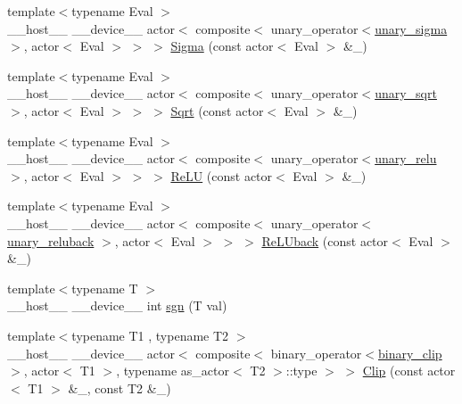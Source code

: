 \begin{DoxyCompactItemize}
\item 
{\footnotesize template$<$typename Eval $>$ }\\\+\_\+\+\_\+host\+\_\+\+\_\+ \+\_\+\+\_\+device\+\_\+\+\_\+ actor$<$ composite$<$ unary\+\_\+operator$<$\hyperlink{structthrust_1_1detail_1_1functional_1_1unary__sigma}{unary\+\_\+sigma} $>$, actor$<$ Eval $>$ $>$ $>$ \hyperlink{namespacethrust_1_1detail_1_1functional_aa947e17014d1d891812df6265b94a8bb}{Sigma} (const actor$<$ Eval $>$ \&\+\_)
\item 
{\footnotesize template$<$typename Eval $>$ }\\\+\_\+\+\_\+host\+\_\+\+\_\+ \+\_\+\+\_\+device\+\_\+\+\_\+ actor$<$ composite$<$ unary\+\_\+operator$<$\hyperlink{structthrust_1_1detail_1_1functional_1_1unary__sqrt}{unary\+\_\+sqrt} $>$, actor$<$ Eval $>$ $>$ $>$ \hyperlink{namespacethrust_1_1detail_1_1functional_a4312d4fbc25873ae875a6986a86cef23}{Sqrt} (const actor$<$ Eval $>$ \&\+\_)
\item 
{\footnotesize template$<$typename Eval $>$ }\\\+\_\+\+\_\+host\+\_\+\+\_\+ \+\_\+\+\_\+device\+\_\+\+\_\+ actor$<$ composite$<$ unary\+\_\+operator$<$\hyperlink{structthrust_1_1detail_1_1functional_1_1unary__relu}{unary\+\_\+relu} $>$, actor$<$ Eval $>$ $>$ $>$ \hyperlink{namespacethrust_1_1detail_1_1functional_a98a54b55473395eabc5424da89281e02}{Re\+LU} (const actor$<$ Eval $>$ \&\+\_)
\item 
{\footnotesize template$<$typename Eval $>$ }\\\+\_\+\+\_\+host\+\_\+\+\_\+ \+\_\+\+\_\+device\+\_\+\+\_\+ actor$<$ composite$<$ unary\+\_\+operator$<$\hyperlink{structthrust_1_1detail_1_1functional_1_1unary__reluback}{unary\+\_\+reluback} $>$, actor$<$ Eval $>$ $>$ $>$ \hyperlink{namespacethrust_1_1detail_1_1functional_a2c1a5d581fb286f11d8ae4d9351074f1}{Re\+L\+Uback} (const actor$<$ Eval $>$ \&\+\_)
\item 
{\footnotesize template$<$typename T $>$ }\\\+\_\+\+\_\+host\+\_\+\+\_\+ \+\_\+\+\_\+device\+\_\+\+\_\+ int \hyperlink{namespacethrust_1_1detail_1_1functional_a340839a77ee36e3897fe8a8a53365ed0}{sgn} (T val)
\item 
{\footnotesize template$<$typename T1 , typename T2 $>$ }\\\+\_\+\+\_\+host\+\_\+\+\_\+ \+\_\+\+\_\+device\+\_\+\+\_\+ actor$<$ composite$<$ binary\+\_\+operator$<$\hyperlink{structthrust_1_1detail_1_1functional_1_1binary__clip}{binary\+\_\+clip} $>$, actor$<$ T1 $>$, typename as\+\_\+actor$<$ T2 $>$\+::type $>$ $>$ \hyperlink{namespacethrust_1_1detail_1_1functional_a978d42540ab63fe9fd4920518458dc05}{Clip} (const actor$<$ T1 $>$ \&\+\_, const T2 \&\+\_)

\end{DoxyCompactItemize}
